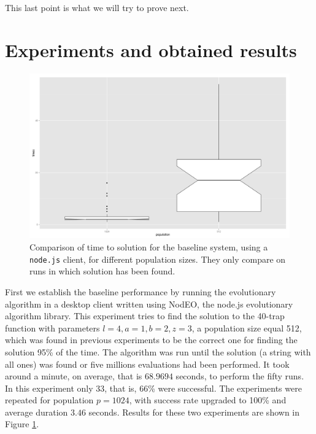 \documentclass[journal,onecolumn]{IEEEtran}
\begin{document}
This last point is what we will try to prove next.

\section{Experiments and obtained results}
\label{sec:experiments}

\begin{figure}[!t]
\centering
\includegraphics[width=12cm]{img/baseline-times.png}
\caption{Comparison of time to solution for the baseline system, using a {\tt
    node.js} client, for different population sizes. They only compare on
runs in which solution has been found.}
\label{fig:baseline}
\end{figure}
First we establish the baseline performance by running the
evolutionary algorithm in a desktop client written using NodEO, 
the node.js evolutionary algorithm library. This experiment tries to 
find the solution to the 40-trap function with parameters $l=4, a=1,
b=2, z=3$, a population size equal 512, which was found in previous
experiments to be the correct one for finding the solution 95\% of the
time. The algorithm was run until the solution (a string with all
ones) was found or five millions evaluations had been performed. It
took around a minute, on average, that is $68.9694$ seconds, to
perform the fifty runs. In this experiment only 33, that is, 66\% were
successful. The experiments were repeated for population $p=1024$,
with success rate upgraded to 100\% and average duration $3.46$
seconds. Results for these two experiments 
are shown in Figure \ref{fig:baseline}.
\end{document}
